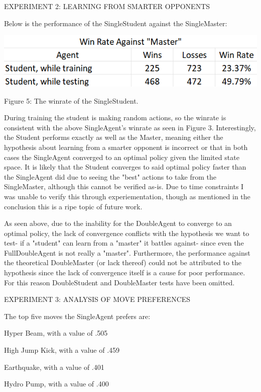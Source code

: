 \documentclass{article}
\begin{document}
\quad EXPERIMENT 2: LEARNING FROM SMARTER OPPONENTS

\quad Below is the performance of the SingleStudent against the SingleMaster:

	\includegraphics[scale=1]{StudentMasterWinRate}

\quad Figure 5: The winrate of the SingleStudent.

\quad During training the student is making random actions, so the winrate is consistent with the above SingleAgent's winrate as seen in Figure 3. Interestingly, the Student performs exactly as well as the Master, meaning either the hypothesis about learning from a smarter opponent is incorrect or that in both cases the SingleAgent converged to an optimal policy given the limited state space. It is likely that the Student converges to said optimal policy faster than the SingleAgent did due to seeing the "best" actions to take from the SingleMaster, although this cannot be verified as-is. Due to time constraints I was unable to verify this through experiementation, though as mentioned in the conclusion this is a ripe topic of future work.

\quad As seen above, due to the inability for the DoubleAgent to converge to an optimal policy, the lack of convergence conflicts with the hypothesis we want to test- if a "student" can learn from a "master" it battles against- since even the FullDoubleAgent is not really a "master". Furthermore, the performance against the theoretical DoubleMaster (or lack thereof) could not be attributed to the hypothesis since the lack of convergence itself is a cause for poor performance. For this reason DoubleStudent and DoubleMaster tests have been omitted.

\quad EXPERIMENT 3: ANALYSIS OF MOVE PREFERENCES

\quad The top five moves the SingleAgent prefers are:

\quad\quad Hyper Beam, with a value of .505

\quad\quad High Jump Kick, with a value of .459

\quad\quad Earthquake, with a value of .401

\quad\quad Hydro Pump, with a value of .400
\end{document}
